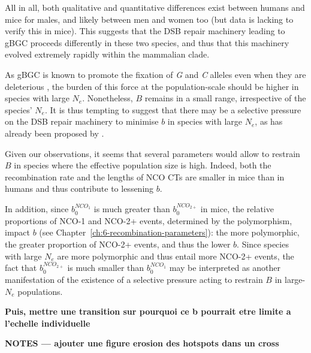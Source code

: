 All in all, both qualitative and quantitative differences exist between humans and mice for males, and likely between men and women too (but data is lacking to verify this in mice). 
This suggests that the DSB repair machinery leading to gBGC proceeds differently in these two species, and thus that this machinery evolved extremely rapidly within the mammalian clade.

As gBGC is known to promote the fixation of \textit{G} and \textit{C} alleles even when they are deleterious \citep{galtier2009gc, neccsulea2011meiotic}, the burden of this force at the population-scale should be higher in species with large $N_e$. Nonetheless, $B$ remains in a small range, irrespective of the species' $N_e$. It is thus tempting to suggest that there may be a selective pressure on the DSB repair machinery to minimise $b$ in species with large $N_e$, as has already been proposed by \citet{galtier2018codon}.

Given our observations, it seems that several parameters would allow to restrain $B$ in species where the effective population size is high.
Indeed, both the recombination rate and the lengths of NCO CTs are smaller in mice than in humans and thus contribute to lessening $b$.

In addition, since $b_0^{NCO_1}$ is much greater than $b_0^{NCO_{2+}}$ in mice, the relative proportions of NCO-1 and NCO-2+ events, determined by the polymorphism, impact $b$ (see Chapter~\ref{ch:6-recombination-parameters}): the more polymorphic, the greater proportion of NCO-2+ events, and thus the lower $b$. Since species with large $N_e$ are more polymorphic and thus entail more NCO-2+ events, the fact that $b_0^{NCO_{2+}}$ is much smaller than $b_0^{NCO_1}$ may be interpreted as another manifestation of the existence of a selective pressure acting to restrain $B$ in large-$N_e$ populations.


\textbf{Puis, mettre une transition sur pourquoi ce b pourrait etre limite a l'echelle individuelle}





\textbf{NOTES — ajouter une figure erosion des hotspots dans un cross}



